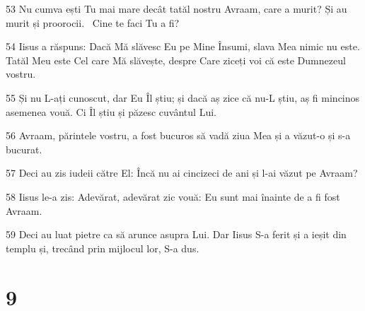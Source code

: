 \par 53 Nu cumva ești Tu mai mare decât tatăl nostru Avraam, care a murit? Și au murit și proorocii.  Cine te faci Tu a fi?
\par 54 Iisus a răspuns: Dacă Mă slăvesc Eu pe Mine Însumi, slava Mea nimic nu este. Tatăl Meu este Cel care Mă slăvește, despre Care ziceți voi că este Dumnezeul vostru.
\par 55 Și nu L-ați cunoscut, dar Eu Îl știu; și dacă aș zice că nu-L știu, aș fi mincinos asemenea vouă. Ci Îl știu și păzesc cuvântul Lui.
\par 56 Avraam, părintele vostru, a fost bucuros să vadă ziua Mea și a văzut-o și s-a bucurat.
\par 57 Deci au zis iudeii către El: Încă nu ai cincizeci de ani și l-ai văzut pe Avraam?
\par 58 Iisus le-a zis: Adevărat, adevărat zic vouă: Eu sunt mai înainte de a fi fost Avraam.
\par 59 Deci au luat pietre ca să arunce asupra Lui. Dar Iisus S-a ferit și a ieșit din templu și, trecând prin mijlocul lor, S-a dus.

\chapter{9}

